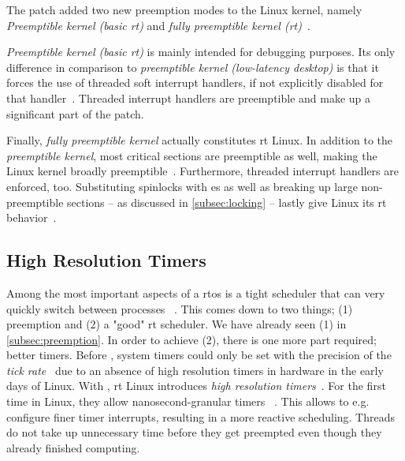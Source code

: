\documentclass[10pt,twocolumn,a4paper]{article}
\begin{document}
\noindent The  patch added two new preemption modes to the Linux kernel, namely \emph{Preemptible kernel (basic \acrshort{rt})} and \emph{fully preemptible kernel (\acrshort{rt})}~\cite{lf:preemption}.

\emph{Preemptible kernel (basic \acrshort{rt})} is mainly intended for debugging purposes.
Its only difference in comparison to \emph{preemptible kernel (low-latency desktop)} is that it forces the use of threaded soft interrupt handlers, if not explicitly disabled for that handler~\cite{lf:preemption}.
Threaded interrupt handlers are preemptible and make up a significant part of the  patch.

Finally, \emph{fully preemptible kernel} actually constitutes \acrshort{rt} Linux.
In addition to the \emph{preemptible kernel}, most critical sections are preemptible as well, making the Linux kernel broadly preemptible~\cite{lf:preemption}.
Furthermore, threaded interrupt handlers are enforced, too.
Substituting spinlocks with es as well as breaking up large non-preemptible sections -- as discussed in \autoref{subsec:locking} -- lastly give Linux its \acrshort{rt} behavior~\cite{lf:preemption}.

\subsection{High Resolution Timers}\label{subsec:hr-timers}
Among the most important aspects of a \acrshort{rtos} is a tight scheduler that can very quickly switch between processes ~\cite{reghenzani_realtime_2019}.
This comes down to two things; (1) preemption and (2) a "good" \acrshort{rt} scheduler.
We have already seen (1) in \autoref{subsec:preemption}.
In order to achieve (2), there is one more part required; better timers.
Before , system timers could only be set with the precision of the \emph{tick rate}~\cite{reghenzani_realtime_2019} due to an absence of high resolution timers in hardware in the early days of Linux.
With , \acrshort{rt} Linux introduces \emph{high resolution timers}~\cite{lf:timers}.
For the first time in Linux, they allow nanosecond-granular timers ~\cite{reghenzani_realtime_2019}.
This allows to e.g. configure finer timer interrupts, resulting in a more reactive scheduling.
Threads do not take up unnecessary time before they get preempted even though they already finished computing.
\end{document}
